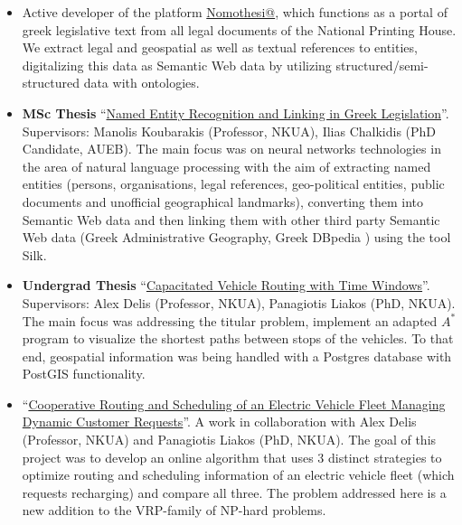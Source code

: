 \documentclass[a4paper,oneside,11pt]{article}
\begin{document}
\begin{itemize}

\item Active developer of the platform \href{http://legislation.di.uoa.gr/}{Nomothesi@}, which functions as a portal of greek legislative text from all legal documents of the National Printing House. We extract legal and geospatial as well as textual references to entities, digitalizing this data as Semantic Web data by utilizing structured/semi-structured data with ontologies.

\item \begin{sloppypar}
\textbf{MSc Thesis} ``\href{https://pergamos.lib.uoa.gr/uoa/dl/frontend/en/browse/2766525}{Named Entity Recognition and Linking in Greek Legislation}''. Supervisors: Manolis Koubarakis (Professor, NKUA), Ilias Chalkidis (PhD Candidate, AUEB).
The main focus was on neural networks technologies in the area of natural language processing with the aim of extracting named entities (persons, organisations, legal references, geo-political entities, public documents and unofficial geographical landmarks), 
converting them into Semantic Web data and then linking them with other third party Semantic Web data (Greek Administrative Geography, Greek DBpedia ) using the tool Silk.

\end{sloppypar}

\item \begin{sloppypar}
\textbf{Undergrad Thesis} ``\href{http://efessos.lib.uoa.gr/applications/disserts.nsf/0f1ab5fee83fbb88c225770c0042ce4f/8da6d56136caaacec2257ea6004c9349?OpenDocument}{Capacitated Vehicle Routing with Time Windows}''. Supervisors: Alex Delis (Professor, NKUA), Panagiotis Liakos (PhD, NKUA). 
The main focus was addressing the titular problem, implement an adapted $A^{*}$ program to visualize the shortest paths between stops of the vehicles. To that end, geospatial information was being handled with a Postgres database with PostGIS functionality.

\end{sloppypar}

\item \begin{sloppypar}
``\href{https://bitbucket.org/Metimdjai/vrppd/src/master/}{Cooperative Routing and Scheduling of an Electric Vehicle Fleet Managing Dynamic Customer Requests}''. A work in collaboration with Alex Delis (Professor, NKUA) and Panagiotis Liakos (PhD, NKUA). 
The goal of this project was to develop an online algorithm that uses 3 distinct strategies to optimize routing and scheduling information of an electric vehicle fleet (which requests recharging) and compare all three. The problem addressed here is a new addition to the VRP-family of NP-hard problems.


\end{sloppypar}
\end{itemize}
\end{document}

